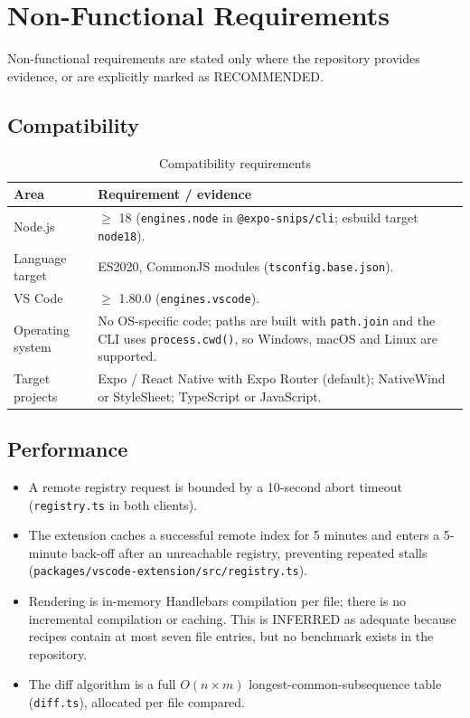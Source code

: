 \chapter{Non-Functional Requirements}
\label{ch:non-functional-requirements}

Non-functional requirements are stated only where the repository provides
evidence, or are explicitly marked as RECOMMENDED.

\section{Compatibility}

\begin{longtable}{p{4.2cm}p{10cm}}
\caption{Compatibility requirements}\\
\toprule
\textbf{Area} & \textbf{Requirement / evidence} \\
\midrule

Node.js & $\geq$ 18 (\texttt{engines.node} in \texttt{@expo-snips/cli}; esbuild
target \texttt{node18}). \\
Language target & ES2020, CommonJS modules (\texttt{tsconfig.base.json}). \\
VS Code & $\geq$ 1.80.0 (\texttt{engines.vscode}). \\
Operating system & No OS-specific code; paths are built with \texttt{path.join}
and the CLI uses \texttt{process.cwd()}, so Windows, macOS and Linux are supported. \\
Target projects & Expo / React Native with Expo Router (default); NativeWind or
StyleSheet; TypeScript or JavaScript. \\
\bottomrule
\end{longtable}

\section{Performance}

\begin{itemize}
  \item A remote registry request is bounded by a 10-second abort timeout
        (\texttt{registry.ts} in both clients).
  \item The extension caches a successful remote index for 5 minutes and enters a
        5-minute back-off after an unreachable registry, preventing repeated stalls
        (\texttt{packages/vscode-extension/src/registry.ts}).
  \item Rendering is in-memory Handlebars compilation per file; there is no
        incremental compilation or caching. This is INFERRED as adequate because
        recipes contain at most seven file entries, but no benchmark exists in the
        repository.
  \item The diff algorithm is a full $O(n \times m)$ longest-common-subsequence
        table (\texttt{diff.ts}), allocated per file compared.
\end{itemize}

